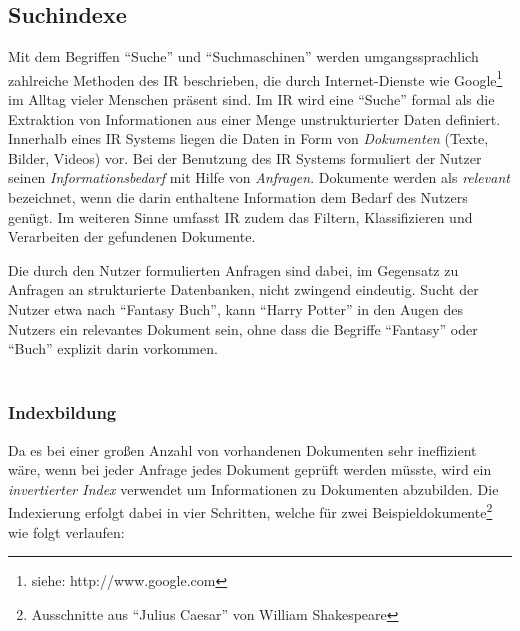 \subsection{Suchindexe}
\label{sec:search}

Mit dem Begriffen ``Suche'' und ``Suchmaschinen'' werden umgangssprachlich zahlreiche Methoden des  \ac{IR} beschrieben, die durch Internet-Dienste wie Google\footnote{siehe: http://www.google.com} im Alltag vieler Menschen präsent sind. Im \acs{IR} wird eine ``Suche'' formal als die Extraktion von Informationen aus einer Menge unstrukturierter Daten definiert. Innerhalb eines \acs{IR} Systems liegen die Daten in Form von \textit{Dokumenten} (Texte, Bilder, Videos) vor. Bei der Benutzung des \acs{IR} Systems formuliert der Nutzer seinen \textit{Informationsbedarf} mit Hilfe von \textit{Anfragen}. Dokumente werden als \textit{relevant} bezeichnet, wenn die darin enthaltene Information dem Bedarf des Nutzers genügt. Im weiteren Sinne umfasst \acs{IR} zudem das Filtern, Klassifizieren und Verarbeiten der gefundenen Dokumente.  \citep{Manning2008}

Die durch den Nutzer formulierten Anfragen sind dabei, im Gegensatz zu Anfragen an strukturierte Datenbanken, nicht zwingend eindeutig. Sucht der Nutzer etwa nach ``Fantasy Buch'', kann ``Harry Potter'' in den Augen des Nutzers ein relevantes Dokument sein, ohne dass die Begriffe ``Fantasy'' oder ``Buch'' explizit darin vorkommen. \\ \\%

\subsubsection{Indexbildung} \label{sec:indexcreation}

Da es bei einer großen Anzahl von vorhandenen Dokumenten sehr ineffizient wäre, wenn bei jeder Anfrage jedes Dokument geprüft werden müsste, wird ein \textit{invertierter Index} verwendet um Informationen zu Dokumenten abzubilden. Die Indexierung erfolgt dabei in vier Schritten, welche für zwei Beispieldokumente\footnote{Ausschnitte aus ``Julius Caesar'' von William Shakespeare} wie folgt verlaufen:


